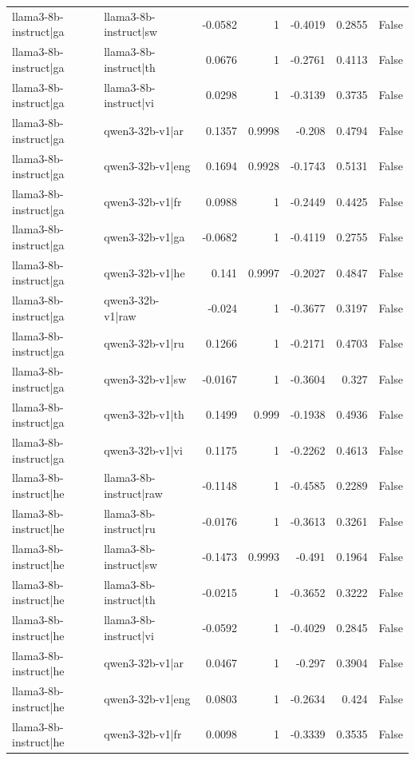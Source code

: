 \begin{table}
\begin{tabular}{l l r r r r l}
llama3-8b-instruct|ga & llama3-8b-instruct|sw & -0.0582 & 1 & -0.4019 & 0.2855 & False \\
llama3-8b-instruct|ga & llama3-8b-instruct|th & 0.0676 & 1 & -0.2761 & 0.4113 & False \\
llama3-8b-instruct|ga & llama3-8b-instruct|vi & 0.0298 & 1 & -0.3139 & 0.3735 & False \\
llama3-8b-instruct|ga & qwen3-32b-v1|ar & 0.1357 & 0.9998 & -0.208 & 0.4794 & False \\
llama3-8b-instruct|ga & qwen3-32b-v1|eng & 0.1694 & 0.9928 & -0.1743 & 0.5131 & False \\
llama3-8b-instruct|ga & qwen3-32b-v1|fr & 0.0988 & 1 & -0.2449 & 0.4425 & False \\
llama3-8b-instruct|ga & qwen3-32b-v1|ga & -0.0682 & 1 & -0.4119 & 0.2755 & False \\
llama3-8b-instruct|ga & qwen3-32b-v1|he & 0.141 & 0.9997 & -0.2027 & 0.4847 & False \\
llama3-8b-instruct|ga & qwen3-32b-v1|raw & -0.024 & 1 & -0.3677 & 0.3197 & False \\
llama3-8b-instruct|ga & qwen3-32b-v1|ru & 0.1266 & 1 & -0.2171 & 0.4703 & False \\
llama3-8b-instruct|ga & qwen3-32b-v1|sw & -0.0167 & 1 & -0.3604 & 0.327 & False \\
llama3-8b-instruct|ga & qwen3-32b-v1|th & 0.1499 & 0.999 & -0.1938 & 0.4936 & False \\
llama3-8b-instruct|ga & qwen3-32b-v1|vi & 0.1175 & 1 & -0.2262 & 0.4613 & False \\
llama3-8b-instruct|he & llama3-8b-instruct|raw & -0.1148 & 1 & -0.4585 & 0.2289 & False \\
llama3-8b-instruct|he & llama3-8b-instruct|ru & -0.0176 & 1 & -0.3613 & 0.3261 & False \\
llama3-8b-instruct|he & llama3-8b-instruct|sw & -0.1473 & 0.9993 & -0.491 & 0.1964 & False \\
llama3-8b-instruct|he & llama3-8b-instruct|th & -0.0215 & 1 & -0.3652 & 0.3222 & False \\
llama3-8b-instruct|he & llama3-8b-instruct|vi & -0.0592 & 1 & -0.4029 & 0.2845 & False \\
llama3-8b-instruct|he & qwen3-32b-v1|ar & 0.0467 & 1 & -0.297 & 0.3904 & False \\
llama3-8b-instruct|he & qwen3-32b-v1|eng & 0.0803 & 1 & -0.2634 & 0.424 & False \\
llama3-8b-instruct|he & qwen3-32b-v1|fr & 0.0098 & 1 & -0.3339 & 0.3535 & False \\

\end{tabular}
\end{table}
